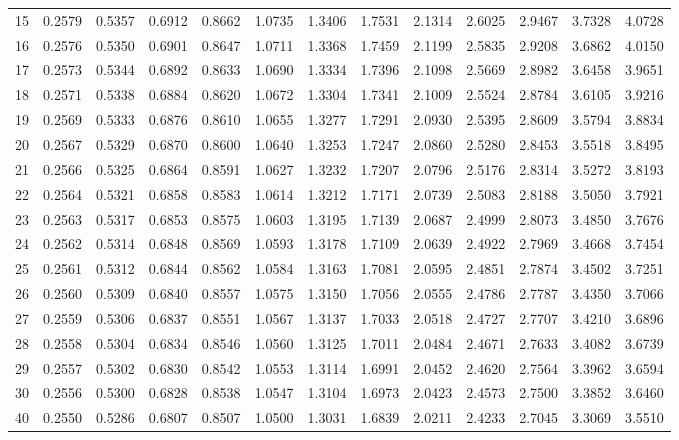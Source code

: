 \begin{table}[htbp]
\begin{tabular}{ccccccccccccc}
		15 & 0.2579 & 0.5357 & 0.6912 & 0.8662 & 1.0735 & 1.3406 & 1.7531 & 2.1314 & 2.6025 & 2.9467 & 3.7328 & 4.0728 \\
		16 & 0.2576 & 0.5350 & 0.6901 & 0.8647 & 1.0711 & 1.3368 & 1.7459 & 2.1199 & 2.5835 & 2.9208 & 3.6862 & 4.0150 \\
		17 & 0.2573 & 0.5344 & 0.6892 & 0.8633 & 1.0690 & 1.3334 & 1.7396 & 2.1098 & 2.5669 & 2.8982 & 3.6458 & 3.9651 \\
		18 & 0.2571 & 0.5338 & 0.6884 & 0.8620 & 1.0672 & 1.3304 & 1.7341 & 2.1009 & 2.5524 & 2.8784 & 3.6105 & 3.9216 \\
		19 & 0.2569 & 0.5333 & 0.6876 & 0.8610 & 1.0655 & 1.3277 & 1.7291 & 2.0930 & 2.5395 & 2.8609 & 3.5794 & 3.8834 \\[5pt]
		20 & 0.2567 & 0.5329 & 0.6870 & 0.8600 & 1.0640 & 1.3253 & 1.7247 & 2.0860 & 2.5280 & 2.8453 & 3.5518 & 3.8495 \\
		21 & 0.2566 & 0.5325 & 0.6864 & 0.8591 & 1.0627 & 1.3232 & 1.7207 & 2.0796 & 2.5176 & 2.8314 & 3.5272 & 3.8193 \\
		22 & 0.2564 & 0.5321 & 0.6858 & 0.8583 & 1.0614 & 1.3212 & 1.7171 & 2.0739 & 2.5083 & 2.8188 & 3.5050 & 3.7921 \\
		23 & 0.2563 & 0.5317 & 0.6853 & 0.8575 & 1.0603 & 1.3195 & 1.7139 & 2.0687 & 2.4999 & 2.8073 & 3.4850 & 3.7676 \\
		24 & 0.2562 & 0.5314 & 0.6848 & 0.8569 & 1.0593 & 1.3178 & 1.7109 & 2.0639 & 2.4922 & 2.7969 & 3.4668 & 3.7454 \\
		25 & 0.2561 & 0.5312 & 0.6844 & 0.8562 & 1.0584 & 1.3163 & 1.7081 & 2.0595 & 2.4851 & 2.7874 & 3.4502 & 3.7251 \\
		26 & 0.2560 & 0.5309 & 0.6840 & 0.8557 & 1.0575 & 1.3150 & 1.7056 & 2.0555 & 2.4786 & 2.7787 & 3.4350 & 3.7066 \\
		27 & 0.2559 & 0.5306 & 0.6837 & 0.8551 & 1.0567 & 1.3137 & 1.7033 & 2.0518 & 2.4727 & 2.7707 & 3.4210 & 3.6896 \\
		28 & 0.2558 & 0.5304 & 0.6834 & 0.8546 & 1.0560 & 1.3125 & 1.7011 & 2.0484 & 2.4671 & 2.7633 & 3.4082 & 3.6739 \\
		29 & 0.2557 & 0.5302 & 0.6830 & 0.8542 & 1.0553 & 1.3114 & 1.6991 & 2.0452 & 2.4620 & 2.7564 & 3.3962 & 3.6594 \\[5pt]
		30 & 0.2556 & 0.5300 & 0.6828 & 0.8538 & 1.0547 & 1.3104 & 1.6973 & 2.0423 & 2.4573 & 2.7500 & 3.3852 & 3.6460 \\
		40 & 0.2550 & 0.5286 & 0.6807 & 0.8507 & 1.0500 & 1.3031 & 1.6839 & 2.0211 & 2.4233 & 2.7045 & 3.3069 & 3.5510 \\

\end{tabular}
\end{table}
